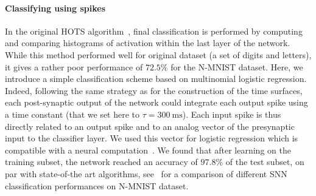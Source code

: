 \documentclass[12pt]{article}
\newcommand{\citep}[1]{\parencite{#1}}
\newcommand{\citet}[1]{\textcite{#1}}
\newcommand{\ms}{\si{\milli\second}}%
\begin{document}
\paragraph*{Classifying using spikes}
In the original HOTS algorithm~\citep{Lagorce17}, final classification is performed by computing and comparing histograms of activation within the last layer of the network. %
While this method performed well for original dataset (a set of digits and letters), it gives a rather poor performance of $72.5\%$ for the N-MNIST dataset.
Here, we introduce a simple classification scheme based on multinomial logistic regression.
Indeed, following the same strategy as for the construction of the time surfaces, each post-synaptic output of the network could integrate each output spike using a time constant (that we set here to $\tau=300~\ms$). Each input spike is thus directly related to an output spike and to an analog vector of the presynaptic input to the classifier layer. We used this vector for logistic regression which is compatible with a neural computation~\citet{Berens12}. We found that after learning on the training subset, the network reached an accuracy of $97.8\%$ of the test subset, on par with state-of-the art algorithms, see~\citet{He20} for a comparison of different SNN classification performances on N-MNIST dataset.
%
\end{document}
